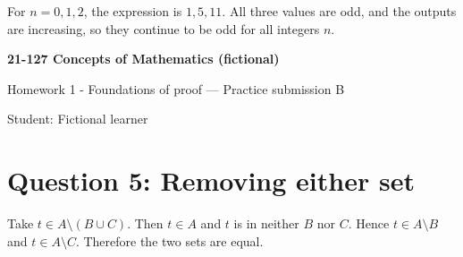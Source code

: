 \documentclass[11pt]{article}
\begin{document}
For $n=0,1,2$, the expression is $1,5,11$. All three values are odd, and the outputs are increasing, so they continue to be odd for all integers $n$.

\newpage
\textbf{21-127 Concepts of Mathematics (fictional)}

Homework 1 - Foundations of proof --- Practice submission B

Student: Fictional learner

\section*{Question 5: Removing either set}

Take $t\in A\setminus(B\cup C)$. Then $t\in A$ and $t$ is in neither $B$ nor $C$. Hence $t\in A\setminus B$ and $t\in A\setminus C$. Therefore the two sets are equal.
\end{document}
